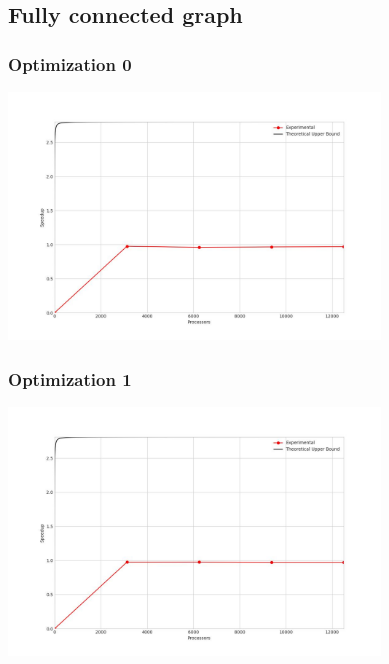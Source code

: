 \clearpage
\subsection{Fully connected graph}
\subsubsection{Optimization 0}
\begin{center}
    \resizebox{0.8\textwidth}{!}{}
    \includegraphics[width=0.74\textwidth]{../img/speedup-graph_type-fully-connected-12500-O0}
\end{center}

\subsubsection{Optimization 1}
\begin{center}
    \resizebox{0.8\textwidth}{!}{}
    \includegraphics[width=0.74\textwidth]{../img/speedup-graph_type-fully-connected-12500-O1}
\end{center}

\clearpage
